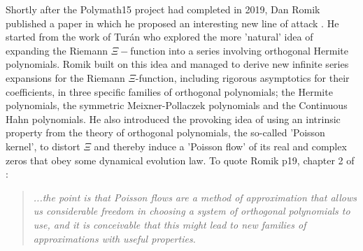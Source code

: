 \documentclass[a4paper,11pt,twoside]{amsart}
\begin{document}
Shortly after the Polymath15 project had completed in 2019, Dan Romik published a paper in which he proposed an interesting new line of attack \cite{rom}. He started from the work of Turán who explored the more 'natural' idea of expanding the Riemann $\Xi-$function into a series involving orthogonal Hermite polynomials. Romik built on this idea and managed to derive new infinite series expansions for the Riemann $\Xi$-function, including rigorous asymptotics for their coefficients, in three specific families of orthogonal polynomials; the Hermite polynomials, the symmetric Meixner-Pollaczek polynomials and the Continuous Hahn polynomials. He also introduced the provoking idea of using an intrinsic property from the theory of orthogonal polynomials, the so-called 'Poisson kernel', to distort $\Xi$ and thereby induce a 'Poisson flow' of its real and complex zeros that obey some dynamical evolution law. To quote Romik p19, chapter 2 of \cite{rom}: 

\begin{quotation}
 \textit{...the point is that Poisson flows are a method of approximation that allows us considerable freedom in choosing a system of orthogonal polynomials to use, and it is conceivable that this might lead to new families of approximations with useful properties.} 
\end{quotation}
\end{document}
